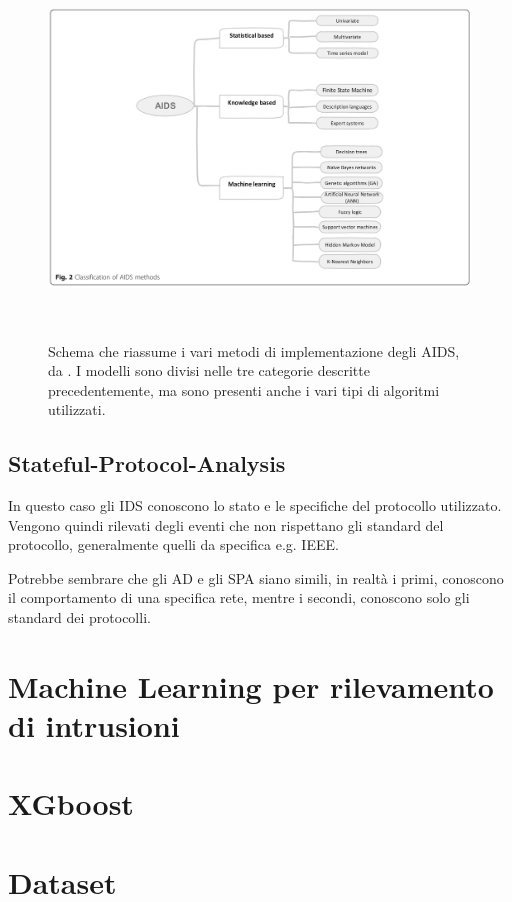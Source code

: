 \begin{figure}[htpb]
    \centering
    \includegraphics[width=\textwidth,height=10cm,keepaspectratio=true]{img/aids_classification.png}
    \caption{
        Schema che riassume i vari metodi di implementazione degli AIDS, da \cite{SurveyIntrusionDetection2019}. I modelli sono divisi nelle tre categorie descritte precedentemente, ma sono presenti anche i vari tipi di algoritmi utilizzati.
    }
    \label{fig:aids_classification}
\end{figure}


\subsection{Stateful-Protocol-Analysis}

In questo caso gli IDS conoscono lo stato e le specifiche del protocollo utilizzato. Vengono quindi rilevati degli eventi che non rispettano gli standard del protocollo, generalmente quelli da specifica e.g. IEEE.

Potrebbe sembrare che gli AD e gli SPA siano simili, in realtà i primi, conoscono il comportamento di una specifica rete,  mentre i secondi, conoscono solo gli standard dei protocolli.



\section{Machine Learning per rilevamento di intrusioni}


\section{XGboost}


\section{Dataset}


